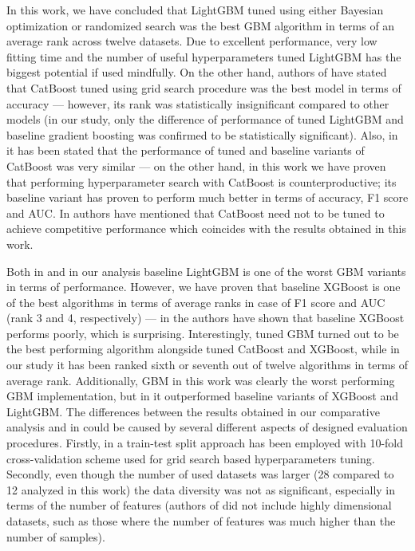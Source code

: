 \documentclass[magisterska, english]{pwr_wmat_praca_dyplomowa}
\theoremstyle{plain}
\numberwithin{theorem}{chapter}
\theoremstyle{definition}
\numberwithin{theorem}{chapter}
\begin{document}
In this work, we have concluded that LightGBM tuned using either Bayesian optimization or randomized search was the best GBM algorithm in terms of an average rank across twelve datasets. Due to excellent performance, very low fitting time and the number of useful hyperparameters tuned LightGBM has the biggest potential if used mindfully. On the other hand, authors of \cite{comparative_analysis} have stated that CatBoost tuned using grid search procedure was the best model in terms of accuracy --- however, its rank was statistically insignificant compared to other models (in our study, only the difference of performance of tuned LightGBM and baseline gradient boosting was confirmed to be statistically significant). Also, in \cite{comparative_analysis} it has been stated that the performance of tuned and baseline variants of CatBoost was very similar --- on the other hand, in this work we have proven that performing hyperparameter search with CatBoost is counterproductive; its baseline variant has proven to perform much better in terms of accuracy, F1 score and AUC. In \cite{comparative_analysis} authors have mentioned that CatBoost need not to be tuned to achieve competitive performance which coincides with the results obtained in this work.

Both in \cite{comparative_analysis} and in our analysis baseline LightGBM is one of the worst GBM variants in terms of performance. However, we have proven that baseline XGBoost is one of the best algorithms in terms of average ranks in case of F1 score and AUC (rank 3 and 4, respectively) --- in \cite{comparative_analysis} the authors have shown that baseline XGBoost performs poorly, which is surprising. Interestingly, tuned GBM turned out to be the best performing algorithm alongside tuned CatBoost and XGBoost, while in our study it has been ranked sixth or seventh out of twelve algorithms in terms of average rank. Additionally, GBM in this work was clearly the worst performing GBM implementation, but in \cite{comparative_analysis} it outperformed baseline variants of XGBoost and LightGBM. The differences between the results obtained in our comparative analysis and in \cite{comparative_analysis} could be caused by several different aspects of designed evaluation procedures. Firstly, in \cite{comparative_analysis} a train-test split approach has been employed with 10-fold cross-validation scheme used for grid search based hyperparameters tuning. Secondly, even though the number of used datasets was larger (28 compared to 12 analyzed in this work) the data diversity was not as significant, especially in terms of the number of features (authors of \cite{comparative_analysis} did not include highly dimensional datasets, such as those where the number of features was much higher than the number of samples).
\end{document}
